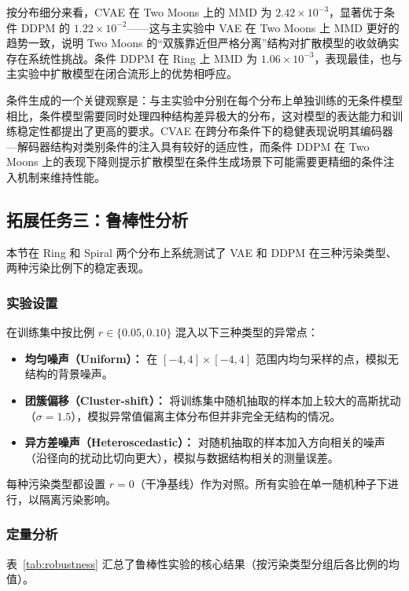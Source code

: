 \documentclass[UTF8,a4paper,12pt]{ctexart}
\begin{document}
按分布细分来看，CVAE 在 Two Moons 上的 MMD 为 $2.42\times 10^{-3}$，显著优于条件 DDPM 的 $1.22\times 10^{-2}$——这与主实验中 VAE 在 Two Moons 上 MMD 更好的趋势一致，说明 Two Moons 的“双簇靠近但严格分离”结构对扩散模型的收敛确实存在系统性挑战。条件 DDPM 在 Ring 上 MMD 为 $1.06\times 10^{-3}$，表现最佳，也与主实验中扩散模型在闭合流形上的优势相呼应。

条件生成的一个关键观察是：与主实验中分别在每个分布上单独训练的无条件模型相比，条件模型需要同时处理四种结构差异极大的分布，这对模型的表达能力和训练稳定性都提出了更高的要求。CVAE 在跨分布条件下的稳健表现说明其编码器—解码器结构对类别条件的注入具有较好的适应性，而条件 DDPM 在 Two Moons 上的表现下降则提示扩散模型在条件生成场景下可能需要更精细的条件注入机制来维持性能。

\subsection{拓展任务三：鲁棒性分析}

本节在 Ring 和 Spiral 两个分布上系统测试了 VAE 和 DDPM 在三种污染类型、两种污染比例下的稳定表现。

\subsubsection{实验设置}

在训练集中按比例 $r\in\{0.05, 0.10\}$ 混入以下三种类型的异常点：

\begin{itemize}
    \item \textbf{均匀噪声（Uniform）：} 在 $[-4,4]\times[-4,4]$ 范围内均匀采样的点，模拟无结构的背景噪声。
    \item \textbf{团簇偏移（Cluster-shift）：} 将训练集中随机抽取的样本加上较大的高斯扰动（$\sigma=1.5$），模拟异常值偏离主体分布但并非完全无结构的情况。
    \item \textbf{异方差噪声（Heteroscedastic）：} 对随机抽取的样本加入方向相关的噪声（沿径向的扰动比切向更大），模拟与数据结构相关的测量误差。
\end{itemize}

每种污染类型都设置 $r=0$（干净基线）作为对照。所有实验在单一随机种子下进行，以隔离污染影响。

\subsubsection{定量分析}

表~\ref{tab:robustness} 汇总了鲁棒性实验的核心结果（按污染类型分组后各比例的均值）。
\end{document}
